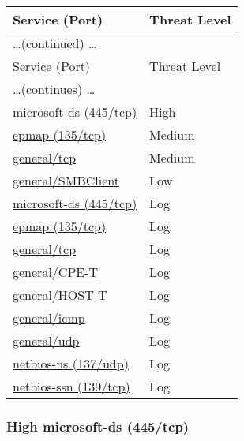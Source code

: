 \documentclass{article}
\begin{document}
\begin{longtable}{|l|l|}
\hline
\rowcolor{openvas_report}Service (Port)&Threat Level\\
\hline
\endfirsthead
\multicolumn{2}{l}{\hfill\ldots (continued) \ldots}\\
\hline
\rowcolor{openvas_report}Service (Port)&Threat Level\\
\hline
\endhead
\hline
\multicolumn{2}{l}{\ldots (continues) \ldots}\\
\endfoot
\hline
\endlastfoot
\hline
\hyperref[port:192.168.248.131 microsoft-ds (445/tcp) High]{microsoft-ds (445/tcp)}&High\\
\hline
\hyperref[port:192.168.248.131 epmap (135/tcp) Medium]{epmap (135/tcp)}&Medium\\
\hline
\hyperref[port:192.168.248.131 general/tcp Medium]{general/tcp}&Medium\\
\hline
\hyperref[port:192.168.248.131 general/SMBClient Low]{general/SMBClient}&Low\\
\hline
\hyperref[port:192.168.248.131 microsoft-ds (445/tcp) Log]{microsoft-ds (445/tcp)}&Log\\
\hline
\hyperref[port:192.168.248.131 epmap (135/tcp) Log]{epmap (135/tcp)}&Log\\
\hline
\hyperref[port:192.168.248.131 general/tcp Log]{general/tcp}&Log\\
\hline
\hyperref[port:192.168.248.131 general/CPE-T Log]{general/CPE-T}&Log\\
\hline
\hyperref[port:192.168.248.131 general/HOST-T Log]{general/HOST-T}&Log\\
\hline
\hyperref[port:192.168.248.131 general/icmp Log]{general/icmp}&Log\\
\hline
\hyperref[port:192.168.248.131 general/udp Log]{general/udp}&Log\\
\hline
\hyperref[port:192.168.248.131 netbios-ns (137/udp) Log]{netbios-ns (137/udp)}&Log\\
\hline
\hyperref[port:192.168.248.131 netbios-ssn (139/tcp) Log]{netbios-ssn (139/tcp)}&Log\\
\hline
\end{longtable}



\subsubsection{High microsoft-ds (445/tcp)}
\label{port:192.168.248.131 microsoft-ds (445/tcp) High}
\end{document}

